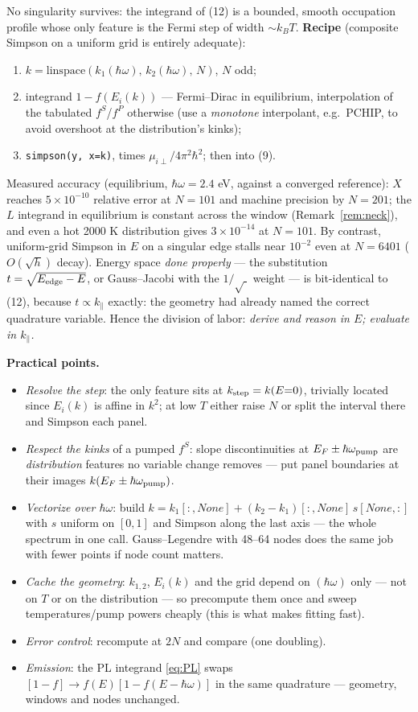 \documentclass[11pt,a4paper]{article}
\numberwithin{equation}{section}
\newcommand{\hw}{\hbar\omega}
\newcommand{\kpar}{k_{\parallel}}
\newcommand{\fFD}{f}
\newcommand{\kB}{k_B}
\begin{document}
No singularity survives: the integrand of (12) is a bounded, smooth
occupation profile whose only feature is the Fermi step of width
$\sim\kB T$.  \textbf{Recipe} (composite Simpson on a uniform grid is
entirely adequate):
\begin{enumerate}
\item $k=\mathrm{linspace}(k_1(\hw),\,k_2(\hw),\,N)$, $N$ odd;
\item integrand $1-\fFD(E_i(k))$ --- Fermi--Dirac in equilibrium,
      interpolation of the tabulated $f^S$/$f^P$ otherwise (use a
      \emph{monotone} interpolant, e.g.\ PCHIP, to avoid overshoot at
      the distribution's kinks);
\item \texttt{simpson(y, x=k)}, times $\mu_{i\perp}/4\pi^2\hbar^2$;
      then into (9).
\end{enumerate}
Measured accuracy (equilibrium, $\hw=2.4$ eV, against a converged
reference): $X$ reaches $5\times10^{-10}$ relative error at $N=101$
and machine precision by $N=201$; the $L$ integrand in equilibrium is
constant across the window (Remark~\ref{rem:neck}), and even a hot
2000 K distribution gives $3\times10^{-14}$ at $N=101$.  By contrast,
uniform-grid Simpson in $E$ on a singular edge stalls near $10^{-2}$
even at $N=6401$ ($O(\sqrt h)$ decay).  Energy space \emph{done
properly} --- the substitution $t=\sqrt{E_{\rm edge}-E}$, or
Gauss--Jacobi with the $1/\sqrt{\;}$ weight --- is bit-identical to
(12), because $t\propto\kpar$ exactly: the geometry had already named
the correct quadrature variable.  Hence the division of labor:
\emph{derive and reason in $E$; evaluate in $\kpar$.}

\textbf{Practical points.}
\begin{itemize}
\item \emph{Resolve the step}: the only feature sits at
      $k_{\rm step}=k(E{=}0)$, trivially located since $E_i(k)$ is
      affine in $k^2$; at low $T$ either raise $N$ or split the
      interval there and Simpson each panel.
\item \emph{Respect the kinks} of a pumped $f^S$: slope
      discontinuities at $E_F\pm\hbar\omega_{\rm pump}$ are
      \emph{distribution} features no variable change removes --- put
      panel boundaries at their images $k(E_F\pm\hbar\omega_{\rm pump})$.
\item \emph{Vectorize over $\hw$}: build
      $k=k_1[:,\!None]+(k_2-k_1)[:,\!None]\,s[None,:]$ with $s$
      uniform on $[0,1]$ and Simpson along the last axis --- the whole
      spectrum in one call.  Gauss--Legendre with 48--64 nodes does
      the same job with fewer points if node count matters.
\item \emph{Cache the geometry}: $k_{1,2}$, $E_i(k)$ and the grid
      depend on $(\hw)$ only --- not on $T$ or on the distribution ---
      so precompute them once and sweep temperatures/pump powers
      cheaply (this is what makes fitting fast).
\item \emph{Error control}: recompute at $2N$ and compare (one
      doubling).
\item \emph{Emission}: the PL integrand \eqref{eq:PL} swaps
      $[1-\fFD]\to \fFD(E)[1-\fFD(E-\hw)]$ in the same quadrature ---
      geometry, windows and nodes unchanged.
\end{itemize}
\end{document}

